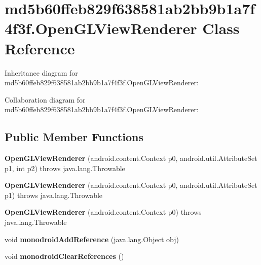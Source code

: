 \hypertarget{classmd5b60ffeb829f638581ab2bb9b1a7f4f3f_1_1_open_g_l_view_renderer}{}\section{md5b60ffeb829f638581ab2bb9b1a7f4f3f.\+Open\+G\+L\+View\+Renderer Class Reference}
\label{classmd5b60ffeb829f638581ab2bb9b1a7f4f3f_1_1_open_g_l_view_renderer}


Inheritance diagram for md5b60ffeb829f638581ab2bb9b1a7f4f3f.\+Open\+G\+L\+View\+Renderer\+:


Collaboration diagram for md5b60ffeb829f638581ab2bb9b1a7f4f3f.\+Open\+G\+L\+View\+Renderer\+:
\subsection*{Public Member Functions}
\begin{DoxyCompactItemize}
\item 
\mbox{\label{classmd5b60ffeb829f638581ab2bb9b1a7f4f3f_1_1_open_g_l_view_renderer_a28f906bba65e6ae686fcd64c6f4d3c76}} 
{\bfseries Open\+G\+L\+View\+Renderer} (android.\+content.\+Context p0, android.\+util.\+Attribute\+Set p1, int p2)  throws java.\+lang.\+Throwable 	
\item 
\mbox{\label{classmd5b60ffeb829f638581ab2bb9b1a7f4f3f_1_1_open_g_l_view_renderer_aacf21ab10c0a6caa88ed7d495cca1f55}} 
{\bfseries Open\+G\+L\+View\+Renderer} (android.\+content.\+Context p0, android.\+util.\+Attribute\+Set p1)  throws java.\+lang.\+Throwable 	
\item 
\mbox{\label{classmd5b60ffeb829f638581ab2bb9b1a7f4f3f_1_1_open_g_l_view_renderer_aaf6cac6430c4b077a72790d407622dcb}} 
{\bfseries Open\+G\+L\+View\+Renderer} (android.\+content.\+Context p0)  throws java.\+lang.\+Throwable 	
\item 
\mbox{\label{classmd5b60ffeb829f638581ab2bb9b1a7f4f3f_1_1_open_g_l_view_renderer_ac8094bbc57aebaa1cd453bac15ea5c5c}} 
void {\bfseries monodroid\+Add\+Reference} (java.\+lang.\+Object obj)
\item 
\mbox{\label{classmd5b60ffeb829f638581ab2bb9b1a7f4f3f_1_1_open_g_l_view_renderer_aba5ec714afa8ec3c8390a6881dd96e13}} 
void {\bfseries monodroid\+Clear\+References} ()
\end{DoxyCompactItemize}
